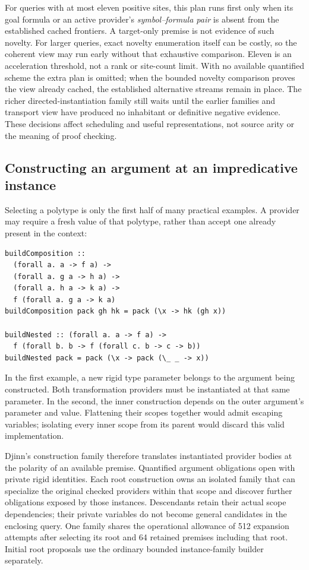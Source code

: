 \documentclass[11pt]{article}
\begin{document}
For queries with at most eleven positive sites, this plan runs first only
when its goal formula or an active provider's \emph{symbol--formula pair} is
absent from the established cached frontiers. A target-only premise is not
evidence of such novelty. For larger queries, exact novelty enumeration itself
can be costly, so the coherent view may run early without that exhaustive
comparison. Eleven is an acceleration threshold, not a rank or site-count
limit. With no available quantified scheme the extra plan is omitted; when
the bounded novelty comparison proves the view already cached, the established
alternative streams remain in place. The richer directed-instantiation family
still waits until the earlier families and transport view have produced no
inhabitant or definitive negative evidence. These decisions affect scheduling
and useful representations, not source arity or the meaning of proof checking.

\subsection{Constructing an argument at an impredicative instance}

Selecting a polytype is only the first half of many practical examples. A
provider may require a fresh value of that polytype, rather than accept one
already present in the context:
\begin{lstlisting}
buildComposition ::
  (forall a. a -> f a) ->
  (forall a. g a -> h a) ->
  (forall a. h a -> k a) ->
  f (forall a. g a -> k a)
buildComposition pack gh hk = pack (\x -> hk (gh x))

buildNested :: (forall a. a -> f a) ->
  f (forall b. b -> f (forall c. b -> c -> b))
buildNested pack = pack (\x -> pack (\_ _ -> x))
\end{lstlisting}
In the first example, a new rigid type parameter belongs to the argument
being constructed. Both transformation providers must be instantiated at
that same parameter. In the second, the inner construction depends on the
outer argument's parameter and value. Flattening their scopes together would
admit escaping variables; isolating every inner scope from its parent would
discard this valid implementation.

Djinn's construction family therefore translates instantiated provider bodies
at the polarity of an available premise. Quantified argument obligations open
with private rigid identities. Each root construction owns an isolated family
that can specialize the original checked providers within that scope and
discover further obligations exposed by those instances. Descendants retain
their actual scope dependencies; their private variables do not become
general candidates in the enclosing query. One family shares the operational
allowance of 512 expansion attempts after selecting its root and 64 retained
premises including that root. Initial root proposals use the ordinary bounded
instance-family builder separately.
\end{document}
